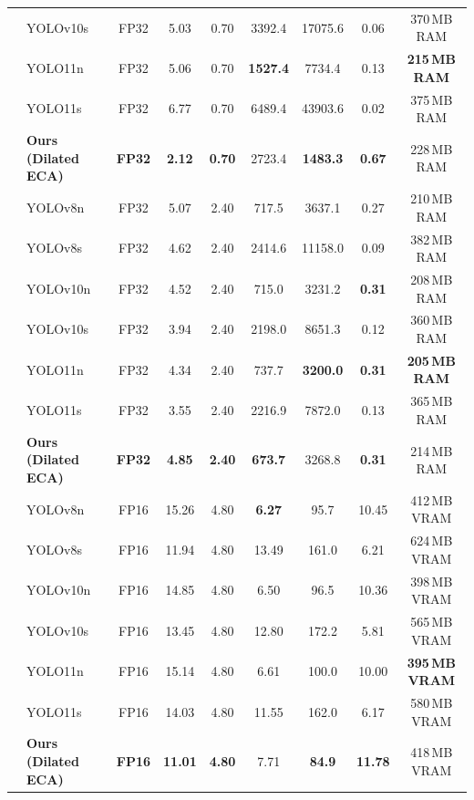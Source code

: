 \documentclass[journal,twoside,web]{ieeecolor}
\begin{document}
\begin{table}[t]
{\begin{tabular}{llccccccc}
 & YOLOv10s & FP32 & 5.03 & 0.70 & 3392.4 & 17075.6 & 0.06 & 370\,MB RAM \\
 & YOLO11n & FP32 & 5.06 & 0.70 & \textbf{1527.4} & 7734.4 & 0.13 & \textbf{215\,MB RAM} \\
 & YOLO11s & FP32 & 6.77 & 0.70 & 6489.4 & 43903.6 & 0.02 & 375\,MB RAM \\
 & \textbf{Ours (Dilated ECA)} & \textbf{FP32} & \textbf{2.12} & \textbf{0.70} & 2723.4 & \textbf{1483.3} & \textbf{0.67} & 228\,MB RAM \\
\midrule
{}
 & YOLOv8n & FP32 & 5.07 & 2.40 & 717.5 & 3637.1 & 0.27 & 210\,MB RAM \\
 & YOLOv8s & FP32 & 4.62 & 2.40 & 2414.6 & 11158.0 & 0.09 & 382\,MB RAM \\
 & YOLOv10n & FP32 & 4.52 & 2.40 & 715.0 & 3231.2 & \textbf{0.31} & 208\,MB RAM \\
 & YOLOv10s & FP32 & 3.94 & 2.40 & 2198.0 & 8651.3 & 0.12 & 360\,MB RAM \\
 & YOLO11n & FP32 & 4.34 & 2.40 & 737.7 & \textbf{3200.0} & \textbf{0.31} & \textbf{205\,MB RAM} \\
 & YOLO11s & FP32 & 3.55 & 2.40 & 2216.9 & 7872.0 & 0.13 & 365\,MB RAM \\
 & \textbf{Ours (Dilated ECA)} & \textbf{FP32} & \textbf{4.85} & \textbf{2.40} & \textbf{673.7} & 3268.8 & \textbf{0.31} & 214\,MB RAM \\
\midrule
{}
 & YOLOv8n & FP16 & 15.26 & 4.80 & \textbf{6.27} & 95.7 & 10.45 & 412\,MB VRAM \\
 & YOLOv8s & FP16 & 11.94 & 4.80 & 13.49 & 161.0 & 6.21 & 624\,MB VRAM \\
 & YOLOv10n & FP16 & 14.85 & 4.80 & 6.50 & 96.5 & 10.36 & 398\,MB VRAM \\
 & YOLOv10s & FP16 & 13.45 & 4.80 & 12.80 & 172.2 & 5.81 & 565\,MB VRAM \\
 & YOLO11n & FP16 & 15.14 & 4.80 & 6.61 & 100.0 & 10.00 & \textbf{395\,MB VRAM} \\
 & YOLO11s & FP16 & 14.03 & 4.80 & 11.55 & 162.0 & 6.17 & 580\,MB VRAM \\
 & \textbf{Ours (Dilated ECA)} & \textbf{FP16} & \textbf{11.01} & \textbf{4.80} & 7.71 & \textbf{84.9} & \textbf{11.78} & 418\,MB VRAM \\

\end{tabular}}
\end{table}
\end{document}
